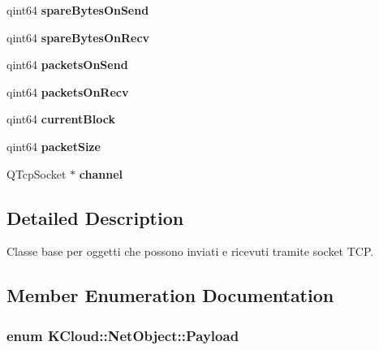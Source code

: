 \begin{DoxyCompactItemize}
\item 
\hypertarget{class_k_cloud_1_1_net_object_aa373300ee4f8f9ec0a2b328b7849fa7d}{qint64 {\bfseries spare\-Bytes\-On\-Send}}\label{class_k_cloud_1_1_net_object_aa373300ee4f8f9ec0a2b328b7849fa7d}

\item 
\hypertarget{class_k_cloud_1_1_net_object_a687887754680d49cc33af655cffaa9f0}{qint64 {\bfseries spare\-Bytes\-On\-Recv}}\label{class_k_cloud_1_1_net_object_a687887754680d49cc33af655cffaa9f0}

\item 
\hypertarget{class_k_cloud_1_1_net_object_ae0f5655d64d823f436e38a524dad257b}{qint64 {\bfseries packets\-On\-Send}}\label{class_k_cloud_1_1_net_object_ae0f5655d64d823f436e38a524dad257b}

\item 
\hypertarget{class_k_cloud_1_1_net_object_a2b1aca94f4be02c7b67acac632b43f77}{qint64 {\bfseries packets\-On\-Recv}}\label{class_k_cloud_1_1_net_object_a2b1aca94f4be02c7b67acac632b43f77}

\item 
\hypertarget{class_k_cloud_1_1_net_object_aebaff2014005f08f62e547139e9515d6}{qint64 {\bfseries current\-Block}}\label{class_k_cloud_1_1_net_object_aebaff2014005f08f62e547139e9515d6}

\item 
\hypertarget{class_k_cloud_1_1_net_object_a827bb9970dd13369d509d5e1fcb6e3fd}{qint64 {\bfseries packet\-Size}}\label{class_k_cloud_1_1_net_object_a827bb9970dd13369d509d5e1fcb6e3fd}

\item 
\hypertarget{class_k_cloud_1_1_net_object_aa275d3fcf6cc28c804500a58533029df}{Q\-Tcp\-Socket $\ast$ {\bfseries channel}}\label{class_k_cloud_1_1_net_object_aa275d3fcf6cc28c804500a58533029df}

\end{DoxyCompactItemize}


\subsection{Detailed Description}
Classe base per oggetti che possono inviati e ricevuti tramite socket T\-C\-P. 

\subsection{Member Enumeration Documentation}
\hypertarget{class_k_cloud_1_1_net_object_a1183d14b184b27ea397cbf2857bc791b}{
\subsubsection[{Payload}]{\setlength{\rightskip}{0pt plus 5cm}enum {\bf K\-Cloud\-::\-Net\-Object\-::\-Payload}}}\label{class_k_cloud_1_1_net_object_a1183d14b184b27ea397cbf2857bc791b}


